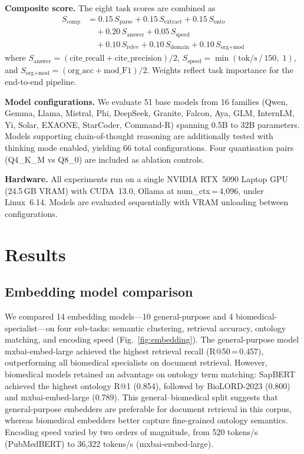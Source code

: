 \documentclass[sn-nature]{sn-jnl}
\begin{document}
\noindent\textbf{Composite score.} The eight task scores are combined as
\begin{align}
  S_{\text{comp}} &= 0.15\,S_{\text{parse}}
                   + 0.15\,S_{\text{extract}}
                   + 0.15\,S_{\text{onto}} \nonumber \\
                  &\quad + 0.20\,S_{\text{answer}}
                   + 0.05\,S_{\text{speed}} \nonumber \\
                  &\quad + 0.10\,S_{\text{relev}}
                   + 0.10\,S_{\text{domain}}
                   + 0.10\,S_{\text{org{+}mod}}
  \label{eq:composite}
\end{align}
where $S_{\text{answer}} = (\text{cite\_recall} + \text{cite\_precision})/2$,
$S_{\text{speed}} = \min(\text{tok/s}\,/\,150,\;1)$, and
$S_{\text{org{+}mod}} = (\text{org\_acc} + \text{mod\_F1})/2$. Weights
reflect task importance for the end-to-end pipeline.

\noindent\textbf{Model configurations.} We evaluate 51 base models from 16
families (Qwen, Gemma, Llama, Mistral, Phi, DeepSeek, Granite, Falcon, Aya,
GLM, InternLM, Yi, Solar, EXAONE, StarCoder, Command-R) spanning 0.5B to
32B parameters. Models supporting chain-of-thought reasoning are additionally
tested with thinking mode enabled, yielding 66 total configurations. Four
quantisation pairs (Q4\_K\_M vs Q8\_0) are included as ablation controls.

\noindent\textbf{Hardware.} All experiments run on a single NVIDIA RTX~5090
Laptop GPU (24.5\,GB VRAM) with CUDA~13.0, Ollama at
num\_ctx\,=\,4{,}096, under Linux~6.14. Models are evaluated sequentially
with VRAM unloading between configurations.

\section{Results}\label{sec:results}

\subsection{Embedding model comparison}\label{sec:embed-results}

We compared 14 embedding models---10 general-purpose and 4
biomedical-specialist---on four sub-tasks: semantic clustering, retrieval
accuracy, ontology matching, and encoding speed (Fig.~\ref{fig:embedding}).
The general-purpose model mxbai-embed-large achieved the highest retrieval
recall (R@50\,=\,0.457), outperforming all biomedical specialists on document
retrieval. However, biomedical models retained an advantage on ontology term
matching: SapBERT achieved the highest ontology R@1 (0.854), followed by
BioLORD-2023 (0.800) and mxbai-embed-large (0.789). This general--biomedical
split suggests that general-purpose embedders are preferable for document
retrieval in this corpus, whereas biomedical embedders better capture
fine-grained ontology semantics. Encoding speed varied by two orders of
magnitude, from 520 tokens/s (PubMedBERT) to 36{,}322 tokens/s
(mxbai-embed-large).
\end{document}
